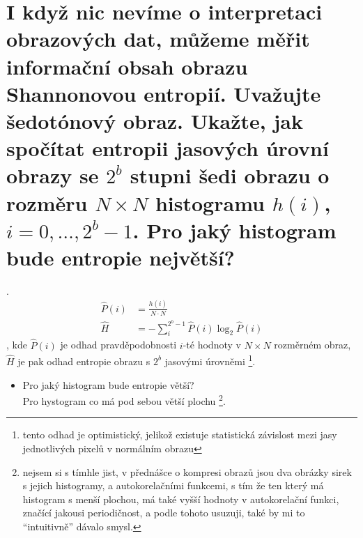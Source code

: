 \section{I když nic nevíme o interpretaci obrazových dat, můžeme měřit informační obsah obrazu Shannonovou entropií. 
Uvažujte šedotónový obraz. Ukažte, jak spočítat entropii jasových úrovní obrazy se $2^b$ stupni šedi obrazu o rozměru 
\texorpdfstring{$N \times N$}{N x N} histogramu \texorpdfstring{$h(i)$}{h(i)}, 
\texorpdfstring{$i=0,\dots,2^b-1$}{i=0,\dots,2^b-1}. Pro jaký histogram bude entropie největší?}.
\begin{align}
  \hat P(i) &= \frac{h(i)}{N\cdot N} \\
  \hat H &= - \sum_i^{2^b-1}\hat P(i)\log_2\hat P(i)
\end{align}
, kde $\hat P(i)$ je odhad pravděpodobnosti $i$-té hodnoty v $N\times N$ rozměrném obraz, $\hat H$ je pak odhad entropie obrazu s $2^b$ jasovými úrovněmi%
\footnote{tento odhad je optimistický, jelikož existuje statistická závislost mezi jasy jednotlivých pixelů v normálním obrazu}.
\begin{itemize}
  \item{Pro jaký histogram bude entropie větší?\\}
    Pro hystogram co má pod sebou větší plochu%
    \footnote{nejsem si s tímhle jist, v přednášce o kompresi obrazů jsou dva obrázky sirek s jejich histogramy, a autokorelačními funkcemi, s tím že ten který má histogram s menší plochou, má také vyšší hodnoty v autokorelační funkci, značící jakousi periodičnost, a podle tohoto usuzuji, také by mi to \enquote{intuitivně} dávalo smysl.}.
\end{itemize}
